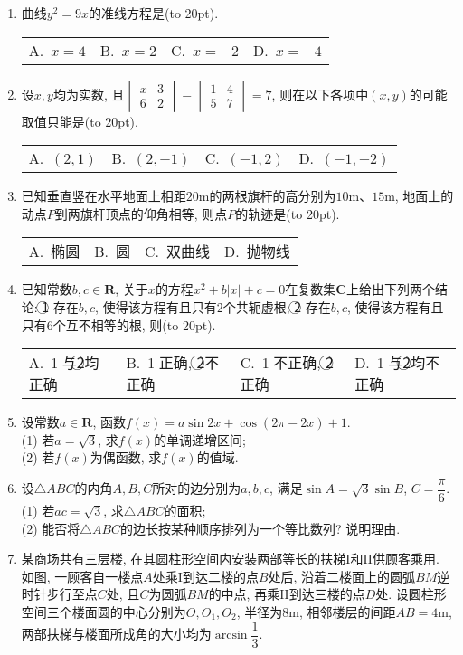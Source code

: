 \documentclass[10pt,a4paper]{article}
\newcommand{\bracket}[1]{(\hbox to #1pt{})}
\newcommand{\fourch}[4]{\par\begin{tabular}{p{.23\textwidth}p{.23\textwidth}p{.23\textwidth}p{.23\textwidth}}
A.~#1 &B.~#2& C.~#3& D.~#4
\end{tabular}}
\begin{document}
\begin{enumerate}[1.]
\item 曲线$y^2=9x$的准线方程是\bracket{20}.
\fourch{$x=4$}{$x=2$}{$x=-2$}{$x=-4$}
\item 设$x,y$均为实数, 且$\begin{vmatrix}x & 3 \\ 6 & 2 \end{vmatrix} - \begin{vmatrix} 1 & 4 \\ 5 & 7\end{vmatrix} = 7$, 则在以下各项中$(x,y)$的可能取值只能是\bracket{20}.
\fourch{$(2,1)$}{$(2,-1)$}{$(-1, 2)$}{$(-1, -2)$}
\item 已知垂直竖在水平地面上相距$20\text{m}$的两根旗杆的高分别为$10\text{m}$、$15\text{m}$, 地面上的动点$P$到两旗杆顶点的仰角相等, 则点$P$的轨迹是\bracket{20}.
\fourch{椭圆}{圆}{双曲线}{抛物线}
\item 已知常数$b,c\in \mathbf{R}$, 关于$x$的方程$x^2+b|x|+c=0$在复数集$\mathbf{C}$上给出下列两个结论: \textcircled{1} 存在$b,c$, 使得该方程有且只有$2$个共轭虚根; \textcircled{2} 存在$b,c$, 使得该方程有且只有$6$个互不相等的根, 则\bracket{20}.
\fourch{\textcircled{1}与\textcircled{2}均正确}{\textcircled{1}正确, \textcircled{2}不正确}{\textcircled{1}不正确, \textcircled{2}正确}{\textcircled{1}与\textcircled{2}均不正确}
\item 设常数$a\in \mathbf{R}$, 函数$f(x)=a\sin 2x+\cos(2\pi-2x)+1$.\\
(1) 若$a=\sqrt{3}$, 求$f(x)$的单调递增区间;\\
(2) 若$f(x)$为偶函数, 求$f(x)$的值域.
\item 设$\triangle ABC$的内角$A,B,C$所对的边分别为$a,b,c$, 满足$\sin A=\sqrt{3}\sin B$, $C=\dfrac\pi 6$.\\
(1) 若$ac=\sqrt{3}$, 求$\triangle ABC$的面积;\\
(2) 能否将$\triangle ABC$的边长按某种顺序排列为一个等比数列? 说明理由.
\item 某商场共有三层楼, 在其圆柱形空间内安装两部等长的扶梯I和II供顾客乘用. 如图, 一顾客自一楼点$A$处乘I到达二楼的点$B$处后, 沿着二楼面上的圆弧$BM$逆时针步行至点$C$处, 且$C$为圆弧$BM$的中点, 再乘II到达三楼的点$D$处. 设圆柱形空间三个楼面圆的中心分别为$O,O_1,O_2$, 半径为$8\text{m}$, 相邻楼层的间距$AB=4\text{m}$, 两部扶梯与楼面所成角的大小均为$\arcsin\dfrac 13$.
\begin{center}
\end{center}
\end{enumerate}
\end{document}
